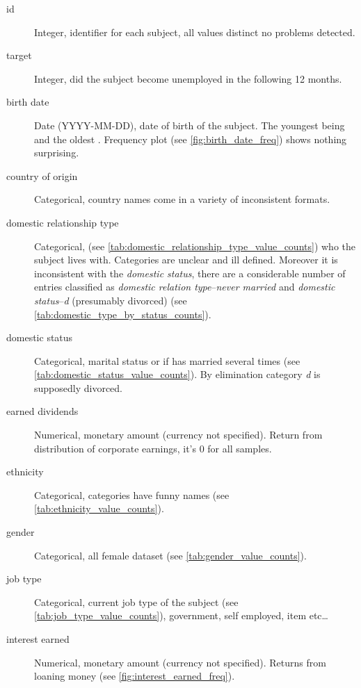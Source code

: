 \begin{description}
\item [id] Integer, identifier for each subject, all values distinct no
    problems detected.

\item [target] Integer, did the subject become unemployed in the following
    12 months.

\item [birth date] Date (YYYY-MM-DD), date of birth of the subject.
    The youngest being  and the oldest
    .
    Frequency plot (see \vref{fig:birth_date_freq}) shows nothing surprising.

\item [country of origin] Categorical, country names come in a variety of
    inconsistent formats.

\item [domestic relationship type] Categorical,
    (see \vref{tab:domestic_relationship_type_value_counts}) who the subject
    lives with.
    Categories are unclear and ill defined.
    Moreover it is inconsistent with the \emph{domestic status}, there are a
    considerable number of entries classified as
    \emph{domestic relation type}--\emph{never married} and
    \emph{domestic status}--\emph{d} (presumably divorced)
    (see \vref{tab:domestic_type_by_status_counts}).

\item [domestic status] Categorical, marital status or if has married several
    times (see \vref{tab:domestic_status_value_counts}).
    By elimination category \emph{d} is supposedly divorced.

\item [earned dividends] Numerical, monetary amount (currency not specified).
    Return from distribution of corporate earnings, it's 0 for all samples.

\item [ethnicity] Categorical, categories have funny names
    (see \vref{tab:ethnicity_value_counts}).

\item [gender] Categorical, all female dataset
    (see \vref{tab:gender_value_counts}).

\item [job type] Categorical, current job type of the subject
    (see \vref{tab:job_type_value_counts}), government, self employed,
    item etc\ldots

\item [interest earned] Numerical, monetary amount (currency not specified).
    Returns from loaning money (see \vref{fig:interest_earned_freq}).


\end{description}
